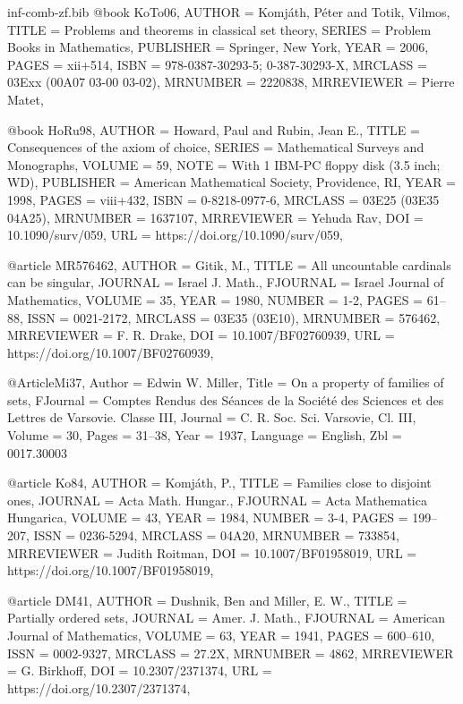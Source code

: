 \documentclass[a4paper,10pt,reqno]{amsart}
\numberwithin{equation}{section}
\theoremstyle{definition}
\theoremstyle{remark}
\begin{document}
\begin{filecontents}[overwrite]{inf-comb-zf.bib}
@book {KoTo06,
AUTHOR = {Komj\'{a}th, P\'{e}ter and Totik, Vilmos},
 TITLE = {Problems and theorems in classical set theory},
SERIES = {Problem Books in Mathematics},
PUBLISHER = {Springer, New York},
  YEAR = {2006},
 PAGES = {xii+514},
  ISBN = {978-0387-30293-5; 0-387-30293-X},
MRCLASS = {03Exx (00A07 03-00 03-02)},
MRNUMBER = {2220838},
MRREVIEWER = {Pierre Matet},
}
   
@book {HoRu98,
    AUTHOR = {Howard, Paul and Rubin, Jean E.},
     TITLE = {Consequences of the axiom of choice},
    SERIES = {Mathematical Surveys and Monographs},
    VOLUME = {59},
      NOTE = {With 1 IBM-PC floppy disk (3.5 inch; WD)},
 PUBLISHER = {American Mathematical Society, Providence, RI},
      YEAR = {1998},
     PAGES = {viii+432},
      ISBN = {0-8218-0977-6},
   MRCLASS = {03E25 (03E35 04A25)},
  MRNUMBER = {1637107},
MRREVIEWER = {Yehuda Rav},
       DOI = {10.1090/surv/059},
       URL = {https://doi.org/10.1090/surv/059},
}


@article {MR576462,
    AUTHOR = {Gitik, M.},
     TITLE = {All uncountable cardinals can be singular},
   JOURNAL = {Israel J. Math.},
  FJOURNAL = {Israel Journal of Mathematics},
    VOLUME = {35},
      YEAR = {1980},
    NUMBER = {1-2},
     PAGES = {61--88},
      ISSN = {0021-2172},
   MRCLASS = {03E35 (03E10)},
  MRNUMBER = {576462},
MRREVIEWER = {F. R. Drake},
       DOI = {10.1007/BF02760939},
       URL = {https://doi.org/10.1007/BF02760939},
}


@Article{Mi37,
 Author = {Edwin W. {Miller}},
 Title = {{On a property of families of sets}},
 FJournal = {{Comptes Rendus des S\'eances de la Soci\'et\'e des Sciences et des Lettres de Varsovie. Classe III}},
 Journal = {{C. R. Soc. Sci. Varsovie, Cl. III}},
 Volume = {30},
 Pages = {31--38},
 Year = {1937},
 Language = {English},
 Zbl = {0017.30003}
}

@article {Ko84,
    AUTHOR = {Komj\'{a}th, P.},
     TITLE = {Families close to disjoint ones},
   JOURNAL = {Acta Math. Hungar.},
  FJOURNAL = {Acta Mathematica Hungarica},
    VOLUME = {43},
      YEAR = {1984},
    NUMBER = {3-4},
     PAGES = {199--207},
      ISSN = {0236-5294},
   MRCLASS = {04A20},
  MRNUMBER = {733854},
MRREVIEWER = {Judith Roitman},
       DOI = {10.1007/BF01958019},
       URL = {https://doi.org/10.1007/BF01958019},
}






@article {DM41,
    AUTHOR = {Dushnik, Ben and Miller, E. W.},
     TITLE = {Partially ordered sets},
   JOURNAL = {Amer. J. Math.},
  FJOURNAL = {American Journal of Mathematics},
    VOLUME = {63},
      YEAR = {1941},
     PAGES = {600--610},
      ISSN = {0002-9327},
   MRCLASS = {27.2X},
  MRNUMBER = {4862},
MRREVIEWER = {G. Birkhoff},
       DOI = {10.2307/2371374},
       URL = {https://doi.org/10.2307/2371374},
}


\end{filecontents}
\end{document}
